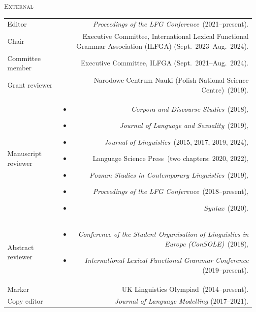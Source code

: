 \documentclass[11pt,a4paper]{article}
\makeatletter
\newlength{\rulelength}%
\newenvironment{cvsection}{%
  \setlength{\extrarowheight}{0.70ex}
  \begin{longtable}[l]{@{} L R @{}}
}{%
  \end{longtable}
}
\newlength{\squish}
\newenvironment{reviewlist}
{%
\vspace*{-8pt}%
\begin{itemize}[noitemsep,label={},nosep,left=0pt .. \parindent]%
}
{%
\end{itemize}
}
\newcommand{\Label}[1]{%
\textnormal{#1}%
}
\newcommand{\cvheading}[1]{\noindent{{\color{headercolor}\rule[0.4ex]{\rulelength}{2pt}\hspace*{9pt} \Large #1}}\vspace*{0.5\baselineskip}}
\newcommand{\cvsubhead}[1]{\noindent\hspace*{\rulelength}\hspace*{9pt} \textsc{#1}\vspace*{0.25\baselineskip}}
\makeatother
\begin{document}
\cvheading{Commissions of trust}

\cvsubhead{External}
\begin{cvsection}
  \Label{Editor} & \textit{Proceedings of the LFG Conference}~(2021--present).\\
  \Label{Chair} & Executive Committee, International Lexical Functional Grammar Association (ILFGA) (Sept.~2023--Aug.~2024).\\ %
  \Label{Committee member} & Executive Committee, ILFGA (Sept.~2021--Aug.~2024).\\
\Label{Grant reviewer} &
                    Narodowe Centrum Nauki (Polish National Science Centre)~(2019).\\
\Label{Manuscript reviewer} &
                \begin{reviewlist}
                \item \textit{Corpora and Discourse Studies}~(2018),
                \item \textit{Journal of Language and Sexuality}~(2019),
                \item \textit{Journal of Linguistics}~(2015, 2017, 2019, 2024),
                \item Language Science Press~(two chapters: 2020, 2022),
                \item \textit{Poznan Studies in Contemporary Linguistics}~(2019),
                \item \textit{Proceedings of the LFG Conference}~(2018--present),
                \item  \textit{Syntax}~(2020).
                \end{reviewlist}
                 \\[\squish]
\Label{Abstract reviewer}   &
                \begin{reviewlist}
                \item \textit{Conference of the Student Organisation of Linguistics in Europe (ConSOLE)}~(2018),
                \item \textit{International Lexical Functional Grammar Conference} (2019--present).
                \end{reviewlist}
                \\[\squish]
\Label{Marker}      & UK Linguistics Olympiad~(2014--present).\\
\Label{Copy editor} & \textit{Journal of Language Modelling} (2017--2021).
\end{cvsection}
%
\vspace{0.2\squish}
\end{document}
